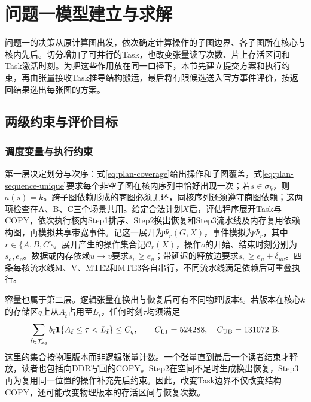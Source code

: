 \section{问题一模型建立与求解}
\label{sec:question-one}

问题一的决策从原计算图出发，依次确定计算操作的子图边界、各子图所在核心与核内先后。切分增加了可并行的Task，也改变张量读写次数、片上存活区间和Task激活时刻。为把这些作用放在同一口径下，本节先建立提交方案和执行约束，再由张量接收Task推导结构搬运，最后将有限候选送入官方事件评价，按返回结果选出每张图的方案。

\subsection{两级约束与评价目标}
\subsubsection{调度变量与执行约束}
第一层决定划分与次序：式\eqref{eq:plan-coverage}给出操作和子图覆盖，式\eqref{eq:plan-sequence-unique}要求每个非空子图在核内序列中恰好出现一次；若$s\in\sigma_k$，则$a(s)=k$。跨子图依赖形成的商图必须无环，同核序列还须遵守商图依赖；这两项检查在A、B、C三个场景共用。给定合法计划$X$后，评估程序展开Task与COPY，依次执行核内Step1排序、Step2换出恢复和Step3流水线及内存复用依赖构图，再模拟共享带宽事件。记这一展开为$\Psi_r(G,X)$，事件模拟为$\Phi_r$，其中$r\in\{A,B,C\}$。展开产生的操作集合记$\mathcal O_r(X)$，操作$o$的开始、结束时刻分别为$s_o,e_o$。数据或内存依赖$u\to v$要求$s_v\ge e_u$；带延迟的释放边要求$s_v\ge e_u+\delta_{uv}$。四条每核流水线M、V、MTE2和MTE3各自串行，不同流水线满足依赖后可重叠执行。

容量也属于第二层。逻辑张量在换出与恢复后可有不同物理版本$\tilde t$。若版本在核心$k$的存储区$q$上从$A_{\tilde t}$占用至$L_{\tilde t}$，任何时刻$\tau$均须满足
\begin{equation}
\sum_{\tilde t\in\mathcal T_{kq}} b_{\tilde t}
\mathbf1\{A_{\tilde t}\le\tau<L_{\tilde t}\}\le C_q,\qquad
C_{\rm L1}=524288,\quad C_{\rm UB}=131072\ \mathrm{B}.
\label{eq:capacity}
\end{equation}
这里的集合按物理版本而非逻辑张量计数。一个张量直到最后一个读者结束才释放，读者也包括向DDR写回的COPY。Step2在空间不足时生成换出恢复，Step3再为复用同一位置的操作补充先后约束。因此，改变Task边界不仅改变结构COPY，还可能改变物理版本的存活区间与恢复次数。

